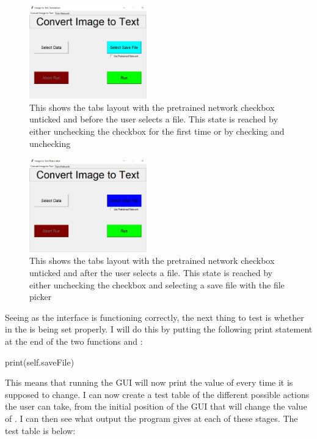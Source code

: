 \documentclass{report}
\begin{document}
\begin{figure}[H]
    \centering
    \includegraphics[width=2in]{Images/Development and Testing/Stage 7/Image to Text Conversion Tab/Tests for Select Save File/Without pretrained network selected and without file chosen.png}
    \caption{This shows the tabs layout with the pretrained network checkbox unticked and before the user selects a file. This state is reached by either unchecking the checkbox for the first time or by checking and unchecking}
\end{figure}
\begin{figure}[H]
    \centering
    \includegraphics[width=2in]{Images/Development and Testing/Stage 7/Image to Text Conversion Tab/Tests for Select Save File/Without pretrained network selected and with file chosen.png}
    \caption{This shows the tabs layout with the pretrained network checkbox unticked and after the user selects a file. This state is reached by either unchecking the checkbox and selecting a save file with the file picker}
\end{figure}
\newpage
\noindent Seeing as the interface is functioning correctly, the next thing to test is whether  in the  is being set properly. I will do this by putting the following print statement at the end of the two functions  and :
\begin{python}
print(self.saveFile)
\end{python}
This means that running the GUI will now print the value of  every time it is supposed to change. I can now create a test table of the different possible actions the user can take, from the initial position of the GUI that will change the value of . I can then see what output the program gives at each of these stages. The test table is below:
\end{document}
